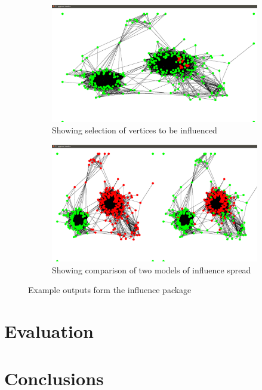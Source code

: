 \documentclass[12pt,a4paper]{article}
\begin{document}
\begin{figure}
\centering
	\begin{subfigure}[b]{0.4\linewidth}
	\caption{Showing selection of vertices to be influenced}
	\label{fig:influenceSelect}
	\includegraphics[scale=0.1]{Influence1.png}
	\end{subfigure}
\quad
	\begin{subfigure}[b]{0.4\linewidth}
	\caption{Showing comparison of two models of influence spread}
	\label{fig:influenceCompare}
	\includegraphics[scale=0.1]{Influence3.png}
	\end{subfigure}
\caption{Example outputs form the influence package}
\label{fig:influence}
\end{figure}

\section{Evaluation}

\section{Conclusions}


\end{document}
